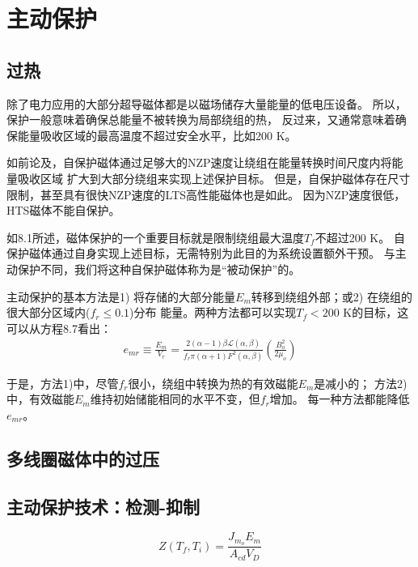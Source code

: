 \section{主动保护}
\subsection{过热}
除了电力应用的大部分超导磁体都是以磁场储存大量能量的低电压设备。
所以，保护一般意味着确保总能量不被转换为局部绕组的热，
反过来，又通常意味着确保能量吸收区域的最高温度不超过安全水平，比如200 K。

如前论及，自保护磁体通过足够大的NZP速度让绕组在能量转换时间尺度内将能量吸收区域
扩大到大部分绕组来实现上述保护目标。
但是，自保护磁体存在尺寸限制，甚至具有很快NZP速度的LTS高性能磁体也是如此。
因为NZP速度很低，HTS磁体不能自保护。

如8.1所述，磁体保护的一个重要目标就是限制绕组最大温度$T_f$不超过200 K。
自保护磁体通过自身实现上述目标，无需特别为此目的为系统设置额外干预。
与主动保护不同，我们将这种自保护磁体称为是“被动保护”的。

主动保护的基本方法是1) 将存储的大部分能量$E_m$转移到绕组外部；或2) 在绕组的很大部分区域内($f_r\le 0.1$)分布
能量。两种方法都可以实现$T_f<200$ K的目标，这可以从方程8.7看出：
\begin{align*}%
e_{mr}\equiv\frac{E_m}{V_r}=\frac{2(\alpha-1)\beta\mathcal{L}(\alpha,\beta)}{f_r\pi(\alpha+1)F^2(\alpha,\beta)}\left(\frac{B_{o}^{2}}{2\mu_o}\right) \tag{8.7}
\end{align*}

于是，方法1)中，尽管$f_r$很小，绕组中转换为热的有效磁能$E_m$是减小的；
方法2)中，有效磁能$E_m$维持初始储能相同的水平不变，但$f_r$增加。
每一种方法都能降低$e_{mr}$。

\subsection{多线圈磁体中的过压}


\subsection{主动保护技术：检测-抑制}

\begin{equation}%
Z(T_f,T_i)=\frac{J_{m_o}E_m}{A_{cd}V_D}
\end{equation}


